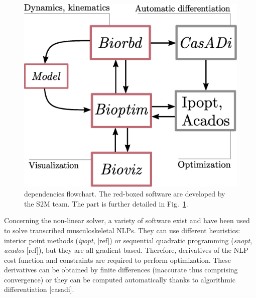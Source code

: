 \begin{figure}[t!]
\centering
\includegraphics[width=0.9\columnwidth]{figures/dependencies.eps}
\caption{\bioptim dependencies flowchart. The red-boxed software are developed by the S2M team. The \bioptim part is further detailed in Fig.~\ref{fig:dependencies}.}
\label{fig:dependencies}
\vspace*{-0.5cm}
\end{figure}

Concerning the non-linear solver, a variety of software exist and have been used to solve transcribed musculoskeletal NLPs.
They can use different heuristics: interior point methods (\textit{ipopt}, [ref]) or sequential quadratic programming (\textit{snopt}, \textit{acados} [ref]), but they are all gradient based.
Therefore, derivatives of the NLP cost function and constraints are required to perform optimization.
These derivatives can be obtained by finite differences (inaccurate thus comprising convergence) or they can be computed automatically thanks to algorithmic differentiation [casadi].

